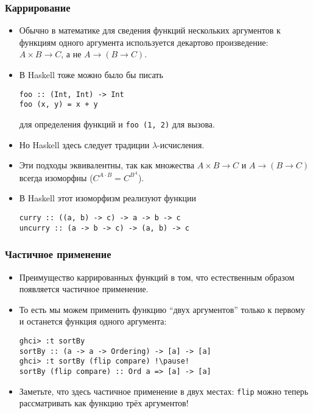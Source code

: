 \documentclass[10pt]{beamer}
\begin{document}
\begin{frame}[fragile]
  \frametitle{Каррирование}
  \begin{itemize}
    \item Обычно в математике для сведения функций нескольких аргументов к функциям одного аргумента используется декартово произведение: $A \times B \to C$, а не $A \to (B \to C)$.\pause
    \item В Haskell тоже можно было бы писать
          \begin{lstlisting}
foo :: (Int, Int) -> Int
foo (x, y) = x + y
\end{lstlisting}
          для определения функций и \lstinline|foo (1, 2)| для вызова.\pause
    \item Но Haskell здесь следует традиции $\lambda$-исчисления.\pause
    \item Эти подходы эквивалентны, так как множества $A \times B \to C$ и $A \to (B \to C)$ всегда изоморфны \pause ($C^{A \cdot B} = C^{B^A}$).
    \item В Haskell этот изоморфизм реализуют функции\pause
          \begin{lstlisting}
curry :: ((a, b) -> c) -> a -> b -> c
uncurry :: (a -> b -> c) -> (a, b) -> c
\end{lstlisting}
  \end{itemize}
\end{frame}

\begin{frame}[fragile]
  \frametitle{Частичное применение}
  \begin{itemize}
    \item Преимущество каррированных функций в том, что естественным образом появляется частичное применение.
    \item То есть мы можем применить функцию \enquote{двух аргументов} только к первому и останется функция одного аргумента:
          \begin{lstlisting}
ghci> :t sortBy
sortBy :: (a -> a -> Ordering) -> [a] -> [a]
ghci> :t sortBy (flip compare) !\pause!
sortBy (flip compare) :: Ord a => [a] -> [a]
\end{lstlisting}\pause
    \item Заметьте, что здесь частичное применение в двух местах: \pause\lstinline|flip| можно теперь рассматривать как функцию трёх аргументов!
  \end{itemize}
\end{frame}
\end{document}
